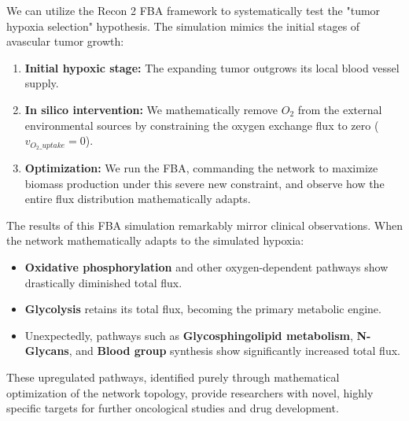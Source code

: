 We can utilize the Recon 2 FBA framework to systematically test the "tumor hypoxia selection" hypothesis. The simulation mimics the initial stages of avascular tumor growth:
\begin{enumerate}
    \item \textbf{Initial hypoxic stage:} The expanding tumor outgrows its local blood vessel supply.
    \item \textbf{In silico intervention:} We mathematically remove \(O_2\) from the external environmental sources by constraining the oxygen exchange flux to zero (\(v_{O_2\_uptake} = 0\)).
    \item \textbf{Optimization:} We run the FBA, commanding the network to maximize biomass production under this severe new constraint, and observe how the entire flux distribution mathematically adapts.
\end{enumerate}


The results of this FBA simulation remarkably mirror clinical observations. When the network mathematically adapts to the simulated hypoxia:
\begin{itemize}
    \item \textbf{Oxidative phosphorylation} and other oxygen-dependent pathways show drastically diminished total flux.
    \item \textbf{Glycolysis} retains its total flux, becoming the primary metabolic engine.
    \item Unexpectedly, pathways such as \textbf{Glycosphingolipid metabolism}, \textbf{N-Glycans}, and \textbf{Blood group} synthesis show significantly increased total flux.
\end{itemize}
These upregulated pathways, identified purely through mathematical optimization of the network topology, provide researchers with novel, highly specific targets for further oncological studies and drug development.